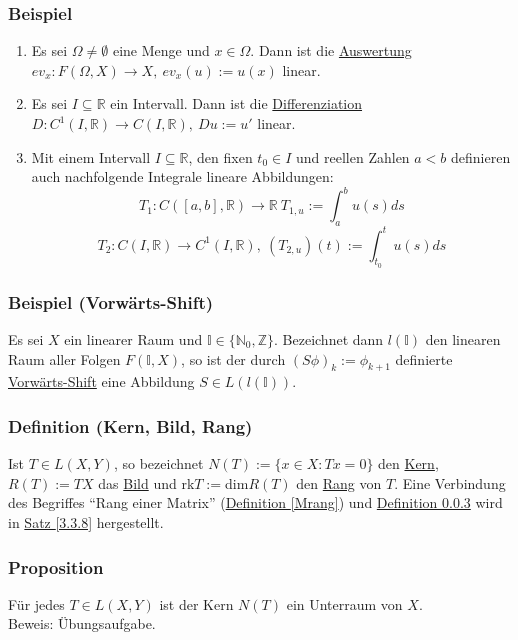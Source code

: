 \subsubsection{Beispiel}
\label{3.1.6}
\begin{enumerate}
\item Es sei $\Omega \not= \emptyset$ eine Menge und $x\in \Omega$.  Dann ist die \underline{Auswertung} $ev_x: F(\Omega ,X)\rightarrow X,\ ev_x(u):=u(x)$ linear.
\item Es sei $I\subseteq \mathbb{R}$ ein Intervall.  Dann ist die \underline{Differenziation} $D:C^1(I,\mathbb{R})\rightarrow C(I,\mathbb{R}),\ Du:=u'$ linear.
\item Mit einem Intervall $I\subseteq \mathbb{R}$, den fixen $t_0\in I$ und reellen Zahlen $a<b$ definieren auch nachfolgende Integrale lineare Abbildungen:
\[T_1:C([a,b],\mathbb{R})\rightarrow \mathbb{R}\ T_{1,u}:=\int_a^b u(s)ds\]
\[T_2:C(I,\mathbb{R})\rightarrow C^1(I,\mathbb{R}),\ (T_{2,u})(t):=\int_{t_0}^t u(s)ds\]
\end{enumerate}
\subsubsection{Beispiel (Vorwärts-Shift)}
Es sei $X$ ein linearer Raum und $\mathbb{I}\in\{\mathbb{N}_0,\mathbb{Z}\}$.  Bezeichnet dann $l(\mathbb{I})$ den linearen Raum aller Folgen $F(\mathbb{I},X)$, so ist der durch $(S\phi )_k:=\phi _{k+1}$ definierte \underline{Vorwärts-Shift} eine Abbildung $S\in L(l(\mathbb{I}))$.
\subsubsection{Definition (Kern, Bild, Rang)}
\label{KBR}
Ist $T\in L(X,Y)$, so bezeichnet $N(T):=\{x\in X:Tx=0\}$ den \underline{Kern}, $R(T):=TX$ das \underline{Bild} und rk$T:=$dim$R(T)$ den \underline{Rang} von $T$.  Eine Verbindung des Begriffes "`Rang einer Matrix"' (\hyperref[Mrang]{Definition \ref*{Mrang}}) und \hyperref[KBR]{Definition \ref*{KBR}} wird in \hyperref[3.3.8]{Satz \ref*{3.3.8}} hergestellt.
\subsubsection{Proposition}
Für jedes $T\in L(X,Y)$ ist der Kern $N(T)$ ein Unterraum von $X$.\\
Beweis: Übungsaufgabe.
